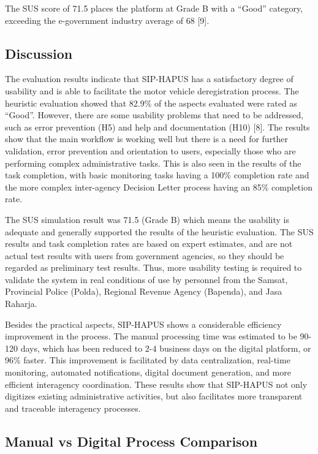 \documentclass[conference,a4paper]{IEEEtran}
\begin{document}
The SUS score of 71.5 places the platform at Grade B with a ``Good'' category, exceeding the e-government industry average of 68 [9].

\subsection{Discussion}
\label{subsec:discussion}

The evaluation results indicate that SIP-HAPUS has a satisfactory degree of usability and is able to facilitate the motor vehicle deregistration process. The heuristic evaluation showed that 82.9\% of the aspects evaluated were rated as “Good”. However, there are some usability problems that need to be addressed, such as error prevention (H5) and help and documentation (H10) [8]. The results show that the main workflow is working well but there is a need for further validation, error prevention and orientation to users, especially those who are performing complex administrative tasks. This is also seen in the results of the task completion, with basic monitoring tasks having a 100\% completion rate and the more complex inter-agency Decision Letter process having an 85\% completion rate.

The SUS simulation result was 71.5 (Grade B) which means the usability is adequate and generally supported the results of the heuristic evaluation. The SUS results and task completion rates are based on expert estimates, and are not actual test results with users from government agencies, so they should be regarded as preliminary test results. Thus, more usability testing is required to validate the system in real conditions of use by personnel from the Samsat, Provincial Police (Polda), Regional Revenue Agency (Bapenda), and Jasa Raharja.

Besides the practical aspects, SIP-HAPUS shows a considerable efficiency improvement in the process. The manual processing time was estimated to be 90-120 days, which has been reduced to 2-4 business days on the digital platform, or 96\% faster. This improvement is facilitated by data centralization, real-time monitoring, automated notifications, digital document generation, and more efficient interagency coordination. These results show that SIP-HAPUS not only digitizes existing administrative activities, but also facilitates more transparent and traceable interagency processes.


\subsection{Manual vs Digital Process Comparison}
\label{subsec:comparison}
\end{document}
